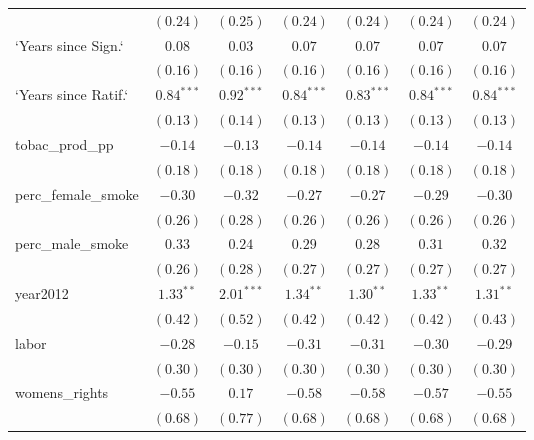 \begin{table}[!h]
\begin{center}
\begin{tabular}{l c c c c c c }
                        & $(0.24)$     & $(0.25)$     & $(0.24)$     & $(0.24)$     & $(0.24)$     & $(0.24)$     \\
`Years since Sign.`     & $0.08$       & $0.03$       & $0.07$       & $0.07$       & $0.07$       & $0.07$       \\
                        & $(0.16)$     & $(0.16)$     & $(0.16)$     & $(0.16)$     & $(0.16)$     & $(0.16)$     \\
`Years since Ratif.`    & $0.84^{***}$ & $0.92^{***}$ & $0.84^{***}$ & $0.83^{***}$ & $0.84^{***}$ & $0.84^{***}$ \\
                        & $(0.13)$     & $(0.14)$     & $(0.13)$     & $(0.13)$     & $(0.13)$     & $(0.13)$     \\
tobac\_prod\_pp         & $-0.14$      & $-0.13$      & $-0.14$      & $-0.14$      & $-0.14$      & $-0.14$      \\
                        & $(0.18)$     & $(0.18)$     & $(0.18)$     & $(0.18)$     & $(0.18)$     & $(0.18)$     \\
perc\_female\_smoke     & $-0.30$      & $-0.32$      & $-0.27$      & $-0.27$      & $-0.29$      & $-0.30$      \\
                        & $(0.26)$     & $(0.28)$     & $(0.26)$     & $(0.26)$     & $(0.26)$     & $(0.26)$     \\
perc\_male\_smoke       & $0.33$       & $0.24$       & $0.29$       & $0.28$       & $0.31$       & $0.32$       \\
                        & $(0.26)$     & $(0.28)$     & $(0.27)$     & $(0.27)$     & $(0.27)$     & $(0.27)$     \\
year2012                & $1.33^{**}$  & $2.01^{***}$ & $1.34^{**}$  & $1.30^{**}$  & $1.33^{**}$  & $1.31^{**}$  \\
                        & $(0.42)$     & $(0.52)$     & $(0.42)$     & $(0.42)$     & $(0.42)$     & $(0.43)$     \\
labor                   & $-0.28$      & $-0.15$      & $-0.31$      & $-0.31$      & $-0.30$      & $-0.29$      \\
                        & $(0.30)$     & $(0.30)$     & $(0.30)$     & $(0.30)$     & $(0.30)$     & $(0.30)$     \\
womens\_rights          & $-0.55$      & $0.17$       & $-0.58$      & $-0.58$      & $-0.57$      & $-0.55$      \\
                        & $(0.68)$     & $(0.77)$     & $(0.68)$     & $(0.68)$     & $(0.68)$     & $(0.68)$     \\

\end{tabular}
\end{center}
\end{table}
